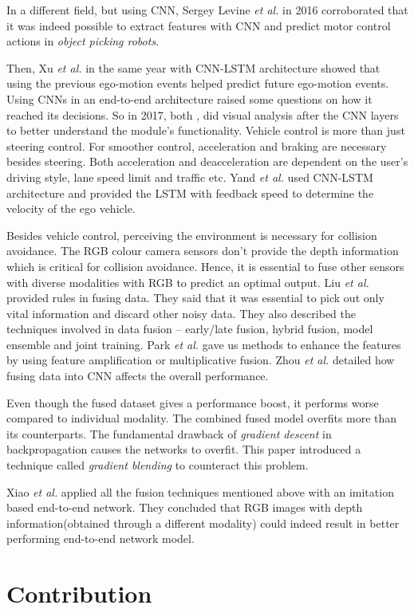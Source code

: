 In a different field, but using CNN, Sergey Levine \textit{et al.}
\cite{GooglePaperonCNNActuation} in 2016 corroborated that it was indeed possible to extract
features with CNN and predict motor control actions in \textit{object picking robots}.

Then, Xu \textit{et al.} \cite{XuGYD16CNNLSTM} in the same year with CNN-LSTM architecture
showed that using the previous ego-motion events helped predict future ego-motion events.
Using CNNs in an end-to-end architecture raised some questions on how it reached its
decisions. So in 2017, both \cite{heatmapsLearning}, \cite{BojarskiCNN1} did visual
analysis after the CNN layers to better understand the module's functionality.
Vehicle control is more than just steering control. For smoother control, acceleration and
braking are necessary besides steering. Both acceleration and deacceleration are dependent on  the user's driving
style, lane speed limit and traffic etc. Yand \textit{et
al.} \cite{E2EMultimodalDiscreteSpeed} used CNN-LSTM architecture and provided the LSTM
with feedback speed to determine the velocity of the ego vehicle.

Besides vehicle control, perceiving the environment is necessary for collision avoidance.
The RGB colour camera sensors don't provide the depth information which is critical for collision avoidance.
Hence, it is essential to fuse other sensors with diverse modalities with RGB to predict an optimal output.
Liu \textit{et al.} \cite{liu2018learn} provided rules in fusing data. They said that it was
essential to pick out only vital information and discard other noisy data.
They also described the techniques involved in data fusion -- early/late
fusion, hybrid fusion, model ensemble and joint training. Park \textit{et
al.} \cite{ParkHBB16} gave us methods to enhance the features by using feature amplification
or multiplicative fusion. Zhou \textit{et al.} \cite{ZhouSideChannel} detailed how fusing
data into CNN affects the overall performance.

Even though the fused dataset gives a performance boost, it performs worse
compared to individual modality. The combined fused model overfits more
than its counterparts. The fundamental drawback of
\textit{gradient descent} in backpropagation causes the networks to overfit. This paper \cite{wang2020makes} introduced a technique
called \textit{gradient blending} to counteract this problem.

Xiao \textit{et al.}\cite{XiaoCodevillaMultimodalE2E} applied all the fusion techniques
mentioned above with an imitation based end-to-end network\cite{codevilla2017endtoend}.
They concluded that RGB images with depth information(obtained through a different modality)
could indeed result in better performing end-to-end network model.

\newpage
\section{Contribution}




